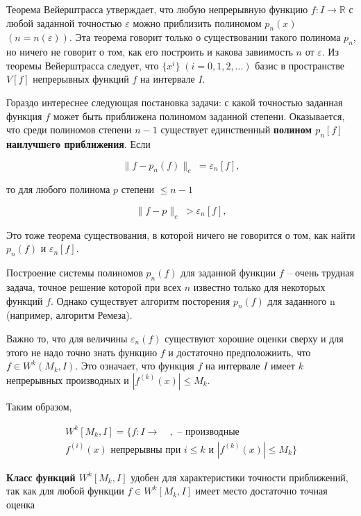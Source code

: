 Теорема Вейерштрасса утверждает, что любую непрерывную функцию $f: I \rightarrow \mathbb{R}$  с любой заданной точностью $\varepsilon$ можно приблизить полиномом $p_n(x)$ $(n = n(\varepsilon))$. 
Эта теорема говорит только о существовании такого полинома $p_n$, но ничего не говорит о том, как его построить и какова завиимость $n$ от $\varepsilon$. 
Из теоремы Вейерштрасса следует, что $\{x^i\} \; (i = 0, 1, 2, ...)$ базис в пространстве $V[f]$ непрерывных функций $f$ на интервале $I$.

Гораздо интереснее следующая постановка задачи: с какой точностью заданная функция $f$ может быть приближена полиномом заданной степени. 
Оказывается, что среди полиномов степени $n - 1$ существует единственный \textbf{полином $p_n[f]$ наилучшeго приближения}. Если

\begin{equation}\label{eq:best_polynom}
\parallel f - p_n(f) \parallel_c \; = \varepsilon_n[f],
\end{equation}

то для любого полинома $p$ степени $\leq n - 1$

\begin{equation}
\parallel f - p \parallel_c \; > \varepsilon_n[f],
\end{equation}

Это тоже теорема существования, в которой ничего не говорится о том, как найти $p_n(f)$ и  $\varepsilon_n[f]$.

Построение системы полиномов $p_n(f)$ для заданной функции $f$ -- очень трудная задача, точное решение которой при всех $n$ известно только для некоторых функций $f$. 
Однако существует алгоритм посторения $p_n(f)$ для заданного n (например, алгоритм Ремеза).

Важно то, что для величины $\varepsilon_n(f)$ существуют хорошие оценки сверху и для этого не надо точно знать функцию $f$ и достаточно предположиить, что $f \in W^k(M_k, I)$. Это означает, что функция $f$ на интервале $I$ имеет $k$ непрерывных производных и $|f^{(k)}(x)|\leq M_k$. 

Таким образом,

\begin{eqnarray}
W^k[M_k, I] = \{f: I \rightarrow \quad , \text{ -- производные} \nonumber \\
f^{(i)}(x) \text{ непрерывны при $i \leq k$ и } |f^{(k)}(x)| \leq M_k \}
\end{eqnarray}


\textbf{Класс функций $W^k[M_k, I]$} удобен для характеристики точности приближений, так как для любой функции $f \in W^k[M_k, I]$ имеет место достаточно точная оценка

